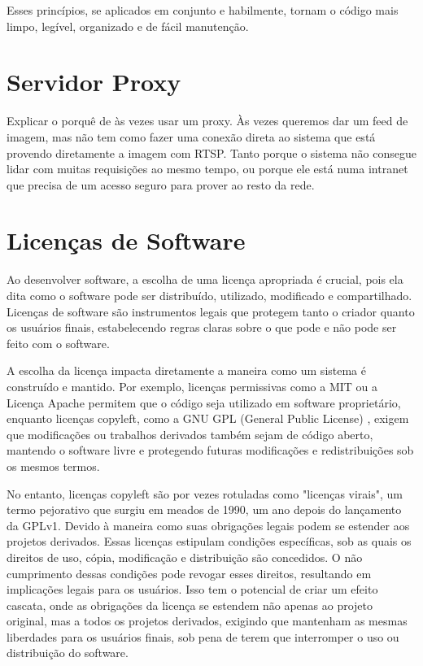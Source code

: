 \documentclass[12pt, %
openright, 
oneside, %
a4paper,    %
brazil]{facom-ufu-abntex2}
\begin{document}
Esses princípios, se aplicados em conjunto e habilmente, tornam o código mais
limpo, legível, organizado e de fácil manutenção. \cite{martin2018clean3}

\section{Servidor Proxy}

Explicar o porquê de às vezes usar um proxy. Às vezes queremos dar um feed de
imagem, mas não tem como fazer uma conexão direta ao sistema que está provendo
diretamente a imagem com RTSP. Tanto porque o sistema não consegue lidar com
muitas requisições ao mesmo tempo, ou porque ele está numa intranet que precisa
de um acesso seguro para prover ao resto da rede.

\section{Licenças de Software}

Ao desenvolver software, a escolha de uma licença apropriada é crucial, pois
ela dita como o software pode ser distribuído, utilizado, modificado e
compartilhado. Licenças de software são instrumentos legais que protegem tanto
o criador quanto os usuários finais, estabelecendo regras claras sobre o que
pode e não pode ser feito com o software.

A escolha da licença impacta diretamente a maneira como um sistema é construído
e mantido. Por exemplo, licenças permissivas como a MIT
\cite{OpenSourceInitiative} ou a Licença Apache \cite{ApacheLicense2004}
permitem que o código seja utilizado em software proprietário, enquanto
licenças copyleft, como a GNU GPL (General Public License) \cite{gnu_gpl},
exigem que modificações ou trabalhos derivados também sejam de código aberto,
mantendo o software livre e protegendo futuras modificações e redistribuições
sob os mesmos termos.

No entanto, licenças copyleft são por vezes rotuladas como "licenças virais",
um termo pejorativo que surgiu em meados de 1990, um ano depois do lançamento
da GPLv1. Devido à maneira como suas obrigações legais podem se estender aos
projetos derivados. Essas licenças estipulam condições específicas, sob as
quais os direitos de uso, cópia, modificação e distribuição são concedidos. O
não cumprimento dessas condições pode revogar esses direitos, resultando em
implicações legais para os usuários. Isso tem o potencial de criar um efeito
cascata, onde as obrigações da licença se estendem não apenas ao projeto
original, mas a todos os projetos derivados, exigindo que mantenham as mesmas
liberdades para os usuários finais, sob pena de terem que interromper o uso ou
distribuição do software. \cite{jargonfile}
\end{document}
